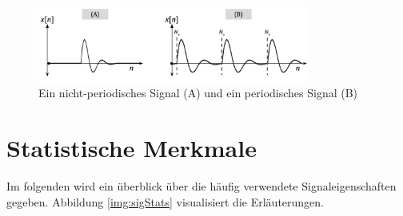 \begin{figure}[h]
	\centering
	\includegraphics[width=0.8\textwidth]{bilder/periodicSig03.png}
	\caption{Ein nicht-periodisches Signal (A) und ein periodisches Signal (B)}
	\label{img:periodicSic}
\end{figure}

\section{Statistische Merkmale}

Im folgenden wird ein überblick über die häufig verwendete Signaleigenschaften gegeben. Abbildung \ref{img:sigStats} visualisiert die Erläuterungen.

